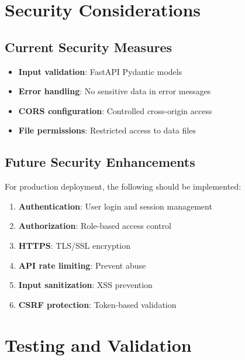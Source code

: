 \documentclass[12pt,a4paper]{article}
\begin{document}
\section{Security Considerations}

\subsection{Current Security Measures}

\begin{itemize}[leftmargin=*]
    \item \textbf{Input validation}: FastAPI Pydantic models
    \item \textbf{Error handling}: No sensitive data in error messages
    \item \textbf{CORS configuration}: Controlled cross-origin access
    \item \textbf{File permissions}: Restricted access to data files
\end{itemize}

\subsection{Future Security Enhancements}

For production deployment, the following should be implemented:

\begin{enumerate}[leftmargin=*]
    \item \textbf{Authentication}: User login and session management
    \item \textbf{Authorization}: Role-based access control
    \item \textbf{HTTPS}: TLS/SSL encryption
    \item \textbf{API rate limiting}: Prevent abuse
    \item \textbf{Input sanitization}: XSS prevention
    \item \textbf{CSRF protection}: Token-based validation
\end{enumerate}

\section{Testing and Validation}
\end{document}
